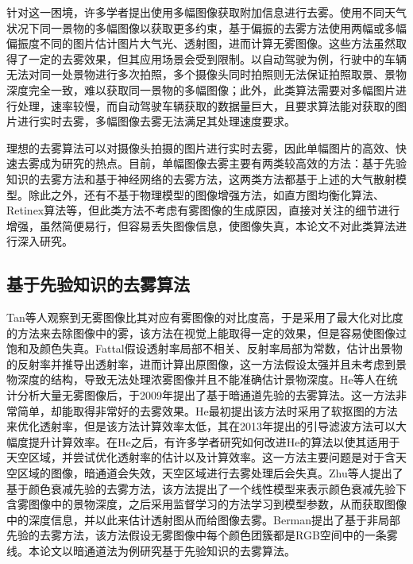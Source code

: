 \documentclass[a4paper, 12pt, oneside]{report}
\begin{document}
{针对这一困境，许多学者提出使用多幅图像获取附加信息进行去雾。\cite{ref3, ref5, ref6}使用不同天气状况下同一景物的多幅图像以获取更多约束，基于偏振的去雾方法\cite{ref7, ref8}使用两幅或多幅偏振度不同的图片估计图片大气光、透射图，进而计算无雾图像。这些方法虽然取得了一定的去雾效果，但其应用场景会受到限制。以自动驾驶为例，行驶中的车辆无法对同一处景物进行多次拍照，多个摄像头同时拍照则无法保证拍照取景、景物深度完全一致，难以获取同一景物的多幅图像；此外，此类算法需要对多幅图片进行处理，速率较慢，而自动驾驶车辆获取的数据量巨大，且要求算法能对获取的图片进行实时去雾，多幅图像去雾无法满足其处理速度要求。

理想的去雾算法可以对摄像头拍摄的图片进行实时去雾，因此单幅图片的高效、快速去雾成为研究的热点。目前，单幅图像去雾主要有两类较高效的方法：基于先验知识的去雾方法和基于神经网络的去雾方法，这两类方法都基于上述的大气散射模型。除此之外，还有不基于物理模型的图像增强方法，如直方图均衡化算法\cite{ref9}、Retinex算法\cite{ref10}等，但此类方法不考虑有雾图像的生成原因，直接对关注的细节进行增强，虽然简便易行，但容易丢失图像信息，使图像失真，本论文不对此类算法进行深入研究。

\subsection{基于先验知识的去雾算法\quad}
Tan\cite{ref11}等人观察到无雾图像比其对应有雾图像的对比度高，于是采用了最大化对比度的方法来去除图像中的雾，该方法在视觉上能取得一定的效果，但是容易使图像过饱和及颜色失真。Fattal\cite{ref12}假设透射率局部不相关、反射率局部为常数，估计出景物的反射率并推导出透射率，进而计算出原图像，这一方法假设太强并且未考虑到景物深度的结构，导致无法处理浓雾图像并且不能准确估计景物深度。He\cite{ref1}等人在统计分析大量无雾图像后，于2009年提出了基于暗通道先验的去雾算法。这一方法非常简单，却能取得非常好的去雾效果。He最初提出该方法时采用了软抠图的方法来优化透射率，但是该方法计算效率太低，其在2013年提出的引导滤波\cite{ref13}方法可以大幅度提升计算效率。在He之后，有许多学者研究如何改进He的算法以使其适用于天空区域，并尝试优化透射率的估计以及计算效率。这一方法主要问题是对于含天空区域的图像，暗通道会失效，天空区域进行去雾处理后会失真。Zhu\cite{ref14}等人提出了基于颜色衰减先验的去雾方法，该方法提出了一个线性模型来表示颜色衰减先验下含雾图像中的景物深度，之后采用监督学习的方法学习到模型参数，从而获取图像中的深度信息，并以此来估计透射图从而给图像去雾。Berman\cite{ref15}提出了基于非局部先验的去雾方法，该方法假设无雾图像中每个颜色团簇都是RGB空间中的一条雾线。本论文以暗通道法为例研究基于先验知识的去雾算法。

}
\end{document}
